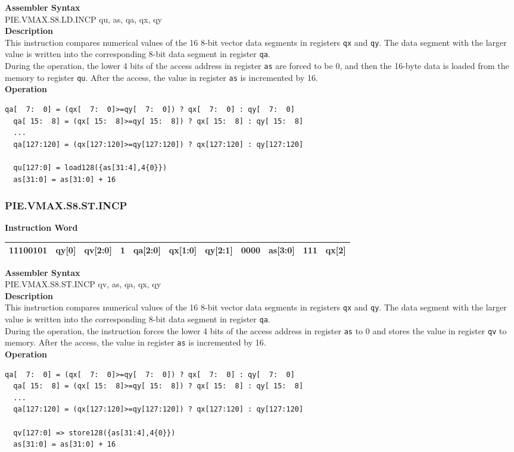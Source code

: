 \textbf{Assembler Syntax} \\
PIE.VMAX.S8.LD.INCP qu, as, qa, qx, qy \\
\textbf{Description} \\
This instruction compares numerical values of the 16 8-bit vector data segments in registers \lstinline{qx} and \lstinline{qy}. The data segment with the larger value is written into the corresponding 8-bit data segment in register \lstinline{qa}.\\
During the operation, the lower 4 bits of the access address in register \lstinline{as} are forced to be 0, and then the 16-byte data is loaded from the memory to register \lstinline{qu}. After the access, the value in register \lstinline{as} is incremented by 16.\\
\textbf{Operation}
\begin{lstlisting}[escapeinside=`?]
  qa[  7:  0] = (qx[  7:  0]>=qy[  7:  0]) ? qx[  7:  0] : qy[  7:  0]
  qa[ 15:  8] = (qx[ 15:  8]>=qy[ 15:  8]) ? qx[ 15:  8] : qy[ 15:  8]
  ...
  qa[127:120] = (qx[127:120]>=qy[127:120]) ? qx[127:120] : qy[127:120]

  qu[127:0] = load128({as[31:4],4{0}})
  as[31:0] = as[31:0] + 16
\end{lstlisting}

\newpage
\subsubsection{PIE.VMAX.S8.ST.INCP}\label{instruction:PIEVMAXS8STINCP}
\setlength\tabcolsep{6pt}
\textbf{Instruction Word} \\
\begin{tabular}{|c|c|c|c|c|c|c|c|c|c|c|}
	\hline
	11100101 & qy[0] & qv[2:0] & 1 & qa[2:0] & qx[1:0] & qy[2:1] & 0000 & as[3:0] & 111 & qx[2] \\
	\hline
\end{tabular}

\textbf{Assembler Syntax} \\
PIE.VMAX.S8.ST.INCP qv, as, qa, qx, qy \\
\textbf{Description} \\
This instruction compares numerical values of the 16 8-bit vector data segments in registers \lstinline{qx} and \lstinline{qy}. The data segment with the larger value is written into the corresponding 8-bit data segment in register \lstinline{qa}.\\
During the operation, the instruction forces the lower 4 bits of the access address in register \lstinline{as} to 0 and stores the value in register \lstinline{qv} to memory. After the access, the value in register \lstinline{as} is incremented by 16.\\
\textbf{Operation}
\begin{lstlisting}[escapeinside=`?]
  qa[  7:  0] = (qx[  7:  0]>=qy[  7:  0]) ? qx[  7:  0] : qy[  7:  0]
  qa[ 15:  8] = (qx[ 15:  8]>=qy[ 15:  8]) ? qx[ 15:  8] : qy[ 15:  8]
  ...
  qa[127:120] = (qx[127:120]>=qy[127:120]) ? qx[127:120] : qy[127:120]

  qv[127:0] => store128({as[31:4],4{0}})
  as[31:0] = as[31:0] + 16
\end{lstlisting}

